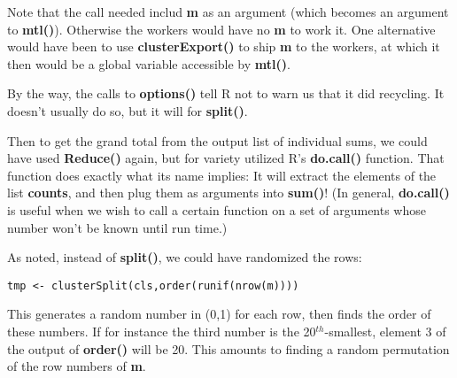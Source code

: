 Note that the call needed includ {\bf m} as an argument (which becomes
an argument to {\bf mtl()}).  Otherwise the workers would have no {\bf
m} to work it.  One alternative would have been to use {\bf
clusterExport()} to ship {\bf m} to the workers, at which it then would
be a global variable accessible by {\bf mtl()}.

By the way, the calls to {\bf options()} tell R not to warn us that it
did recycling.  It doesn't usually do so, but it will for {\bf split()}.

Then to get the grand total from the output list of individual sums, we
could have used {\bf Reduce()} again, but for variety utilized R's {\bf
do.call()} function.  That function does exactly what its name implies:
It will extract the elements of the list {\bf counts}, and then plug
them as arguments into {\bf sum()}!  (In general, {\bf do.call()} is
useful when we wish to call a certain function on a set of arguments
whose number won't be known until run time.)

As noted, instead of {\bf split()}, we could have randomized the rows:

\begin{lstlisting}
tmp <- clusterSplit(cls,order(runif(nrow(m))))
\end{lstlisting}

This generates a random number in (0,1) for each row, then finds the
order of these numbers.  If for instance the third number is the
20$^{th}$-smallest, element 3 of the output of {\bf order()} will be 20.
This amounts to finding a random permutation of the row numbers of {\bf
m}.

